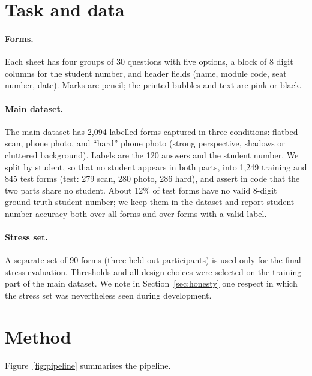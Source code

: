 \documentclass{article}
\begin{document}
\section{Task and data}
\paragraph{Forms.} Each sheet has four groups of 30 questions with five options, a block of
8 digit columns for the student number, and header fields (name, module code, seat number, date).
Marks are pencil; the printed bubbles and text are pink or black.

\paragraph{Main dataset.} The main dataset has 2{,}094 labelled forms captured in three conditions:
flatbed scan, phone photo, and ``hard'' phone photo (strong perspective, shadows or cluttered
background). Labels are the 120 answers and the student number. We split by student, so that no
student appears in both parts, into 1{,}249 training and 845 test forms (test: 279 scan, 280 photo,
286 hard), and assert in code that the two parts share no student. About 12\% of test forms have no
valid 8-digit ground-truth student number; we keep them in the dataset and report student-number
accuracy both over all forms and over forms with a valid label.

\paragraph{Stress set.} A separate set of 90 forms (three held-out participants) is used only for
the final stress evaluation. Thresholds and all design choices were selected on the training part
of the main dataset. We note in Section~\ref{sec:honesty} one respect in which the stress set was
nevertheless seen during development.

\section{Method}
Figure~\ref{fig:pipeline} summarises the pipeline.
\end{document}
